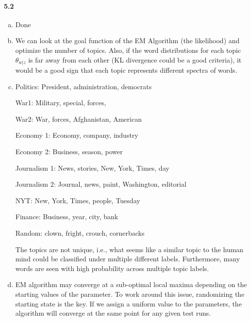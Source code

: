 \documentclass[10pt,letter]{article}
\begin{document}
\paragraph*{5.2}
\begin{enumerate}[(a)]
	\item
	Done
	\item
	We can look at the goal function of the EM Algorithm (the likelihood) and optimize the number of topics. Also, if the word distributions for each topic $\theta_{w|z}$ is far away from each other (KL divergence could be a good criteria), it would be a good sign that each topic represents different spectra of words.
	\item

	Politics: President, administration, democrats

	War1: Military, special, forces,
	
	War2: War, forces, Afghanistan, American

	Economy 1: Economy, company, industry
	
	Economy 2: Business, season, power
	
	Journalism 1: News, stories, New, York, Times, day
	
	Journalism 2: Journal, news, paint, Washington, editorial
	
	NYT: New, York, Times, people, Tuesday
	
	Finance: Business, year, city, bank
	
	Random: clown, fright, crouch, cornerbacks
	
	
	

	
	

	The topics are not unique, i.e., what seems like a similar topic to the human mind could be classified under multiple different labels. Furthermore, many words are seen with high probability across multiple topic labels. 
	\item
	EM algorithm may converge at a sub-optimal local maxima depending on the starting values of the parameter. To work around this issue, randomizing the starting state is the key. If we assign a uniform value to the parameters, the algorithm will converge at the same point for any given test runs. 
\end{enumerate}
\end{document}
